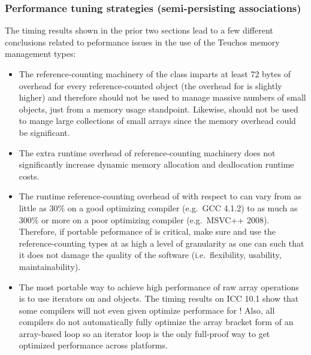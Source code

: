 \documentclass[pdf,ps2pdf,11pt]{SANDreport}
\begin{document}
%
{}\subsubsection{Performance tuning strategies (semi-persisting
associations)}
\label{sec:perf-tuning-strategies}
%

The timing results shown in the prior two sections lead to a few
different conclusions related to peformance issues in the use of the
Teuchos memory management types:

\begin{itemize}

{}\item The reference-counting machinery of the {} class
imparts at least 72 bytes of overhead for every reference-counted
object (the overhead for {} is slightly higher) and
therefore {} should not be used to manage massive numbers
of small objects, just from a memory usage standpoint.  Likewise,
{} should not be used to mange large collections of
small arrays since the memory overhead could be significant.

{}\item The extra runtime overhead of reference-counting machinery
does not significantly increase dynamic memory allocation and
deallocation runtime costs.

{}\item The runtime reference-counting overhead of {} with
respect to {} can vary from as little as 30\%
on a good optimizing compiler (e.g.\ GCC 4.1.2) to as much as 300\% or
more on a poor optimizing compiler (e.g.\ MSVC++ 2008).  Therefore, if
portable peformance of is critical, make sure and use the
reference-counting types at as high a level of granularity as one can
such that it does not damage the quality of the software (i.e.\
flexibility, usability, maintainability).

{}\item The most portable way to achieve high performance of raw array
operations is to use iterators on {}\ttt{ArrayRCP} and
{} objects.  The timing results on ICC 10.1 show
that some compilers will not even given optimize performace for
{}!  Also, all compilers do not
automatically fully optimize the array bracket form of an array-based
loop so an iterator loop is the only full-proof way to get optimized
performance across platforms.

\end{itemize}
\end{document}
